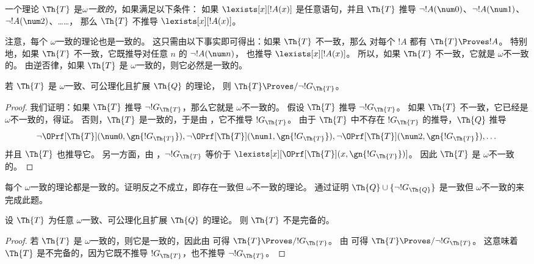 \documentclass[../../../include/open-logic-section]{subfiles}
\begin{document}
\begin{defn}
一个理论 $\Th{T}$ 是\emph{$\omega$一致的}，如果满足以下条件：
如果 $\lexists[x][!A(x)]$ 是任意语句，并且 $\Th{T}$ 推导 $\lnot
!A(\num 0)$、$\lnot !A(\num 1)$、$\lnot !A(\num 2)$、……，
那么 $\Th{T}$ 不推导 $\lexists[x][!A(x)]$。
\end{defn}

注意，每个 $\omega$一致的理论也是一致的。
这只需由以下事实即可得出：如果 $\Th{T}$ 不一致，那么
对每个 $!A$ 都有 $\Th{T} \Proves !A$。
特别地，如果 $\Th{T}$ 不一致，它既推导对任意 $n$ 的 $\lnot !A(\num n)$，
也推导 $\lexists[x][!A(x)]$。
所以，如果 $\Th{T}$ 不一致，它就是 $\omega$不一致的。
由逆否律，如果 $\Th{T}$ 是 $\omega$一致的，则它必然是一致的。

\begin{lem}
若 $\Th{T}$ 是 $\omega$一致、可公理化且扩展 $\Th{Q}$ 的理论，
则 $\Th{T} \Proves/ \lnot !G_{\Th{T}}$。
\end{lem}

\begin{proof}
我们证明：如果 $\Th{T}$ 推导 $\lnot !G_{\Th{T}}$，那么它就是 $\omega$不一致的。
假设 $\Th{T}$ 推导 $\lnot !G_{\Th{T}}$。
如果 $\Th{T}$ 不一致，它已经是 $\omega$不一致的，得证。
否则，$\Th{T}$ 是一致的，于是由 ，它不推导
$!G_{\Th{T}}$。
由于 $\Th{T}$ 中不存在 $!G_{\Th{T}}$ 的推导，$\Th{Q}$ 推导
\[
\lnot \OPrf[\Th{T}](\num 0, \gn{!G_{\Th{T}}}), \lnot \OPrf[\Th{T}](\num 1,
\gn{!G_{\Th{T}}}), \lnot \OPrf[\Th{T}](\num 2, \gn{!G_{\Th{T}}}), \dots
\]
并且 $\Th{T}$ 也推导它。
另一方面，由 ，$\lnot
!G_{\Th{T}}$ 等价于
$\lexists[x][\OPrf[\Th{T}](x,\gn{!G_{\Th{T}}})]$。
因此 $\Th{T}$ 是 $\omega$不一致的。
\end{proof}

\begin{prob}
  每个 $\omega$一致的理论都是一致的。证明反之不成立，即存在一致但 $\omega$不一致的理论。
  通过证明 $\Th{Q} \cup
  \{\lnot !G_{\Th{Q}}\}$ 是一致但 $\omega$不一致的来完成此题。
\end{prob}

\begin{thm}
 设 $\Th{T}$ 为任意
$\omega$一致、可公理化且扩展 $\Th{Q}$ 的理论。
则 $\Th{T}$ 不是完备的。
\end{thm}

\begin{proof}
  若 $\Th{T}$ 是 $\omega$一致的，则它是一致的，因此由  可得 $\Th{T}
  \Proves/ !G_{\Th{T}}$。
  由  可得 $\Th{T} \Proves/ \lnot !G_{\Th{T}}$。
  这意味着 $\Th{T}$ 是不完备的，因为它既不推导 $!G_{\Th{T}}$，也不推导 $\lnot !G_{\Th{T}}$。
\end{proof}
\end{document}
